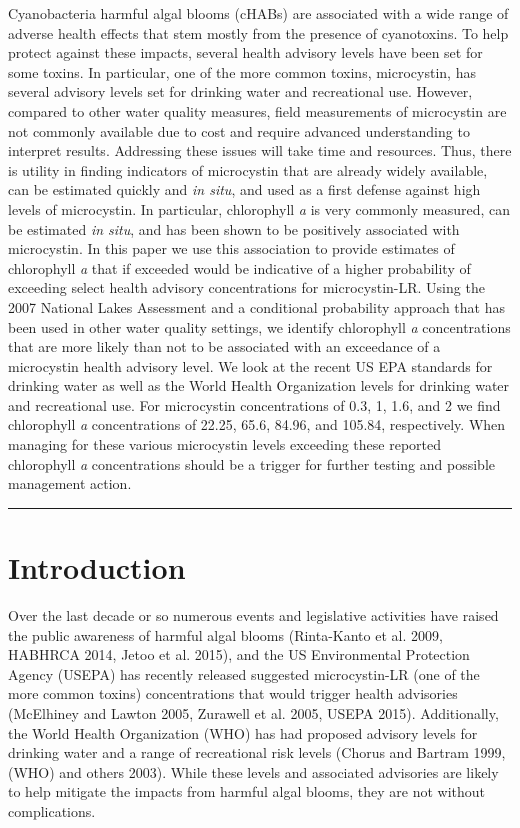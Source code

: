 \documentclass[11pt,]{article}
\begin{document}
Cyanobacteria harmful algal blooms (cHABs) are associated with a wide
range of adverse health effects that stem mostly from the presence of
cyanotoxins. To help protect against these impacts, several health
advisory levels have been set for some toxins. In particular, one of the
more common toxins, microcystin, has several advisory levels set for
drinking water and recreational use. However, compared to other water
quality measures, field measurements of microcystin are not commonly
available due to cost and require advanced understanding to interpret
results. Addressing these issues will take time and resources. Thus,
there is utility in finding indicators of microcystin that are already
widely available, can be estimated quickly and \emph{in situ}, and used
as a first defense against high levels of microcystin. In particular,
chlorophyll \emph{a} is very commonly measured, can be estimated
\emph{in situ}, and has been shown to be positively associated with
microcystin. In this paper we use this association to provide estimates
of chlorophyll \emph{a} that if exceeded would be indicative of a higher
probability of exceeding select health advisory concentrations for
microcystin-LR. Using the 2007 National Lakes Assessment and a
conditional probability approach that has been used in other water
quality settings, we identify chlorophyll \emph{a} concentrations that
are more likely than not to be associated with an exceedance of a
microcystin health advisory level. We look at the recent US EPA
standards for drinking water as well as the World Health Organization
levels for drinking water and recreational use. For microcystin
concentrations of 0.3, 1, 1.6, and 2 we find chlorophyll \emph{a}
concentrations of 22.25, 65.6, 84.96, and 105.84, respectively. When
managing for these various microcystin levels exceeding these reported
chlorophyll \emph{a} concentrations should be a trigger for further
testing and possible management action.

\vspace{3mm}

\hrule

\doublespace

\section{Introduction}\label{introduction}

Over the last decade or so numerous events and legislative activities
have raised the public awareness of harmful algal blooms (Rinta-Kanto et
al. 2009, HABHRCA 2014, Jetoo et al. 2015), and the US Environmental
Protection Agency (USEPA) has recently released suggested microcystin-LR
(one of the more common toxins) concentrations that would trigger health
advisories (McElhiney and Lawton 2005, Zurawell et al. 2005, USEPA
2015). Additionally, the World Health Organization (WHO) has had
proposed advisory levels for drinking water and a range of recreational
risk levels (Chorus and Bartram 1999, (WHO) and others 2003). While
these levels and associated advisories are likely to help mitigate the
impacts from harmful algal blooms, they are not without complications.
\end{document}
